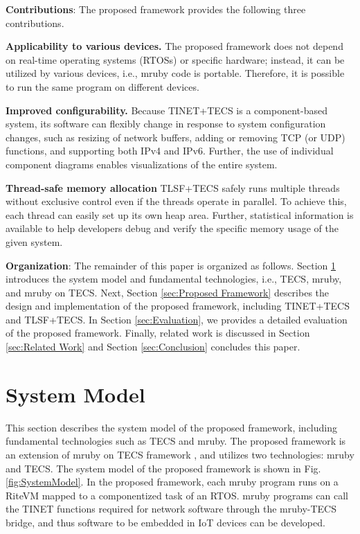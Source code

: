 \documentclass[JIP]{ipsj_v2/UTF8/ipsj}
\begin{document}
{\bf Contributions}: The proposed framework provides the following three contributions.

{\bf Applicability to various devices.}
The proposed framework does not depend on real-time operating systems (RTOSs) or specific hardware; instead, it can be utilized by various devices, i.e., mruby code is portable.
Therefore, it is possible to run the same program on different devices.

{\bf Improved configurability.}
Because TINET+TECS is a component-based system, its software can flexibly change in response to system configuration changes, such as resizing of network buffers, adding or removing TCP (or UDP) functions, and supporting both IPv4 and IPv6.
Further, the use of individual component diagrams enables visualizations of the entire system.

{\bf Thread-safe memory allocation}
TLSF+TECS safely runs multiple threads without exclusive control even if the threads operate in parallel.
To achieve this, each thread can easily set up its own heap area.
Further, statistical information is available to help developers debug and verify the specific memory usage of the given system.

{\bf Organization}: The remainder of this paper is organized as follows.
Section \ref{sec:System Model} introduces the system model and fundamental technologies, i.e., TECS, mruby, and mruby on TECS.
Next, Section \ref{sec:Proposed Framework} describes the design and implementation of the proposed framework, including TINET+TECS and TLSF+TECS.
In Section \ref{sec:Evaluation}, we provides a detailed evaluation of the proposed framework.
Finally, related work is discussed in Section \ref{sec:Related Work} and Section \ref{sec:Conclusion} concludes this paper.


\section{System Model}
\label{sec:System Model}

This section describes the system model of the proposed framework, including fundamental technologies such as TECS and mruby.
The proposed framework is an extension of mruby on TECS framework \cite{par:mrubyonTECS}\cite{par:mrubyonTECS3}, and utilizes two technologies: mruby and TECS.
The system model of the proposed framework is shown in Fig.\ref{fig:SystemModel}.
In the proposed framework, each mruby program runs on a RiteVM mapped to a componentized task of an RTOS.
mruby programs can call the TINET functions required for network software through the mruby-TECS bridge, and thus software to be embedded in IoT devices can be developed.
\end{document}
